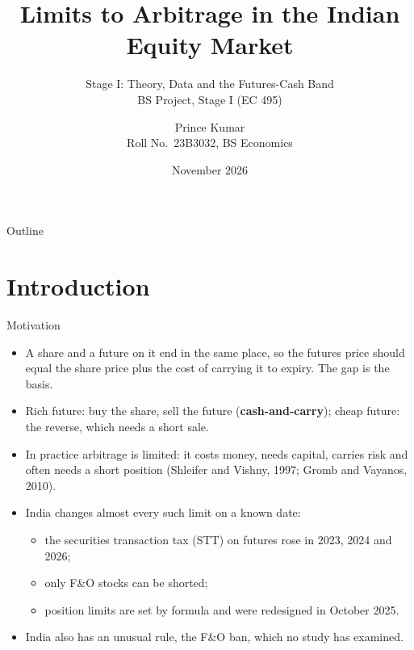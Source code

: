 \documentclass[11pt]{beamer}
\title[Limits to Arbitrage in Indian Equities]{Limits to Arbitrage in the Indian Equity Market}
\subtitle{Stage I: Theory, Data and the Futures-Cash Band\\[2pt]{\small BS Project, Stage I (EC 495)}}
\author[Prince Kumar]{{\small Prince Kumar}\\{\scriptsize Roll No.\ 23B3032, BS Economics}}
\institute[IIT Bombay]{{\scriptsize\textit{Supervisor:} Prof.\ Aditi Chaubal}\\[4pt]
  {\scriptsize Department of Economics\\Indian Institute of Technology Bombay}}
\date[November 2026]{November 2026}
\begin{document}
\begin{frame}
  \titlepage
\end{frame}

\begin{frame}{Outline}
  \tableofcontents
\end{frame}

\section{Introduction}

\begin{frame}{Motivation}
  \begin{itemize}
    \item A share and a future on it end in the same place, so the futures price should equal the share price plus the
    cost of carrying it to expiry. The gap is the \alert{basis}.
    \item Rich future: buy the share, sell the future (\textbf{cash-and-carry}); cheap future: the reverse, which needs
    a short sale.
    \item In practice arbitrage is limited: it costs money, needs capital, carries risk and often needs a short
    position (Shleifer and Vishny, 1997; Gromb and Vayanos, 2010).
    \item India changes almost every such limit on a known date:
    \begin{itemize}
      \item the securities transaction tax (STT) on futures rose in 2023, 2024 and 2026;
      \item only F\&O stocks can be shorted;
      \item position limits are set by formula and were redesigned in October 2025.
    \end{itemize}
    \item India also has an unusual rule, the \alert{F\&O ban}, which no study has examined.
  \end{itemize}
\end{frame}
\end{document}
